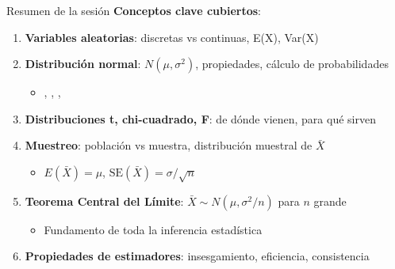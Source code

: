 \documentclass[aspectratio=169, 11pt]{beamer}
\begin{document}
\begin{frame}{Resumen de la sesión}
\textbf{Conceptos clave cubiertos}:

\begin{enumerate}
\item \textbf{Variables aleatorias}: discretas vs continuas, E(X), Var(X)
\item \textbf{Distribución normal}: $N(\mu, \sigma^2)$, propiedades, cálculo de probabilidades
  \begin{itemize}
  \item {}, , , 
  \end{itemize}
\item \textbf{Distribuciones t, chi-cuadrado, F}: de dónde vienen, para qué sirven
\item \textbf{Muestreo}: población vs muestra, distribución muestral de $\bar{X}$
  \begin{itemize}
  \item $E(\bar{X}) = \mu$, $\text{SE}(\bar{X}) = \sigma/\sqrt{n}$
  \end{itemize}
\item \textbf{Teorema Central del Límite}: $\bar{X} \sim N(\mu, \sigma^2/n)$ para $n$ grande
  \begin{itemize}
  \item Fundamento de toda la inferencia estadística
  \end{itemize}
\item \textbf{Propiedades de estimadores}: insesgamiento, eficiencia, consistencia
\end{enumerate}
\end{frame}
\end{document}
